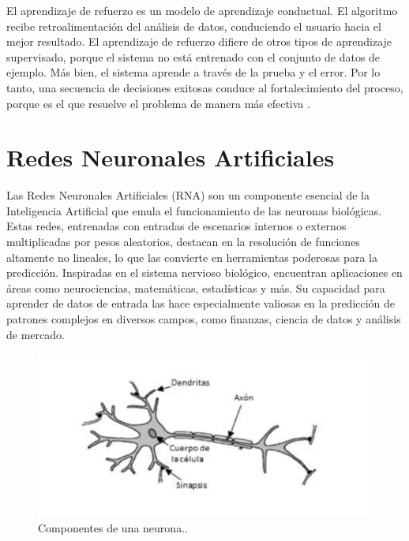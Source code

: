 El aprendizaje de refuerzo es un modelo de aprendizaje conductual. El algoritmo recibe retroalimentación del análisis de datos, conduciendo el usuario hacia el mejor resultado. El aprendizaje de refuerzo difiere de otros tipos de aprendizaje supervisado, porque el sistema no está entrenado con el conjunto de datos de ejemplo. Más bien, el sistema aprende a través de la prueba y el error. Por lo tanto, una secuencia de decisiones exitosas conduce al fortalecimiento del proceso, porque es el que resuelve el problema de manera más efectiva \cite{ibm}.

\section{Redes Neuronales Artificiales}
Las Redes Neuronales Artificiales (RNA) son un componente esencial de la Inteligencia Artificial que emula el funcionamiento de las neuronas biológicas. Estas redes, entrenadas con entradas de escenarios internos o externos multiplicadas por pesos aleatorios, destacan en la resolución de funciones altamente no lineales, lo que las convierte en herramientas poderosas para la predicción. Inspiradas en el sistema nervioso biológico, encuentran aplicaciones en áreas como neurociencias, matemáticas, estadísticas y más. Su capacidad para aprender de datos de entrada las hace especialmente valiosas en la predicción de patrones complejos en diversos campos, como finanzas, ciencia de datos y análisis de mercado.

\begin{figure}[H]
  \begin{center}
    \includegraphics[scale=0.60]{./neuroma_humana.png}
    \caption{Componentes de una neurona..}
    \label{fig:proceso_inventario}
  \end{center}
\end{figure}

